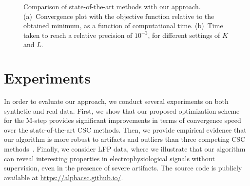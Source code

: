 

\begin{figure}[t]
    \centering
    \vspace{-10pt}
    \caption[Comparison of state-of-the-art methods with our approach.]{Comparison of state-of-the-art methods with our approach. (a)~Convergence plot with the objective function relative to the obtained minimum, as a function of computational time. (b)~Time taken to reach a relative precision of $10^{-2}$, for different settings of $K$ and $L$.  }
    \label{fig:convergence}
\end{figure}

\section{Experiments}
\label{sec:experiments}
In order to evaluate our approach, we conduct several experiments on both synthetic and real data. 
First, we show that our proposed optimization scheme for the M-step provides significant improvements in terms
of convergence speed over the state-of-the-art CSC methods. Then, we provide empirical evidence that our algorithm is more robust to
artifacts and outliers than three competing CSC methods~\citep{jost2006motif,brockmeier2016learning,wohlberg2016efficient}.
%
Finally, we consider LFP data, where we illustrate that our algorithm can reveal interesting properties in electrophysiological signals
without supervision, even in the presence of severe artifacts. The source code is publicly available at \url{https://alphacsc.github.io/}.


